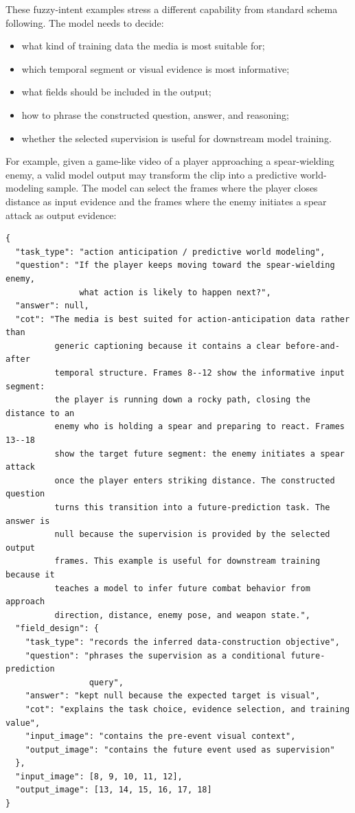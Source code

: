 \documentclass{llmxive}
\begin{document}
These fuzzy-intent examples stress a different capability from standard schema following. The model needs to decide:
\begin{itemize}
    \item what kind of training data the media is most suitable for;
    \item which temporal segment or visual evidence is most informative;
    \item what fields should be included in the output;
    \item how to phrase the constructed question, answer, and reasoning;
    \item whether the selected supervision is useful for downstream model training.
\end{itemize}

For example, given a game-like video of a player approaching a spear-wielding enemy, a valid model output may transform the clip into a predictive world-modeling sample. The model can select the frames where the player closes distance as input evidence and the frames where the enemy initiates a spear attack as output evidence:
\begin{verbatim}
{
  "task_type": "action anticipation / predictive world modeling",
  "question": "If the player keeps moving toward the spear-wielding enemy,
               what action is likely to happen next?",
  "answer": null,
  "cot": "The media is best suited for action-anticipation data rather than
          generic captioning because it contains a clear before-and-after
          temporal structure. Frames 8--12 show the informative input segment:
          the player is running down a rocky path, closing the distance to an
          enemy who is holding a spear and preparing to react. Frames 13--18
          show the target future segment: the enemy initiates a spear attack
          once the player enters striking distance. The constructed question
          turns this transition into a future-prediction task. The answer is
          null because the supervision is provided by the selected output
          frames. This example is useful for downstream training because it
          teaches a model to infer future combat behavior from approach
          direction, distance, enemy pose, and weapon state.",
  "field_design": {
    "task_type": "records the inferred data-construction objective",
    "question": "phrases the supervision as a conditional future-prediction
                 query",
    "answer": "kept null because the expected target is visual",
    "cot": "explains the task choice, evidence selection, and training value",
    "input_image": "contains the pre-event visual context",
    "output_image": "contains the future event used as supervision"
  },
  "input_image": [8, 9, 10, 11, 12],
  "output_image": [13, 14, 15, 16, 17, 18]
}
\end{verbatim}
\end{document}
